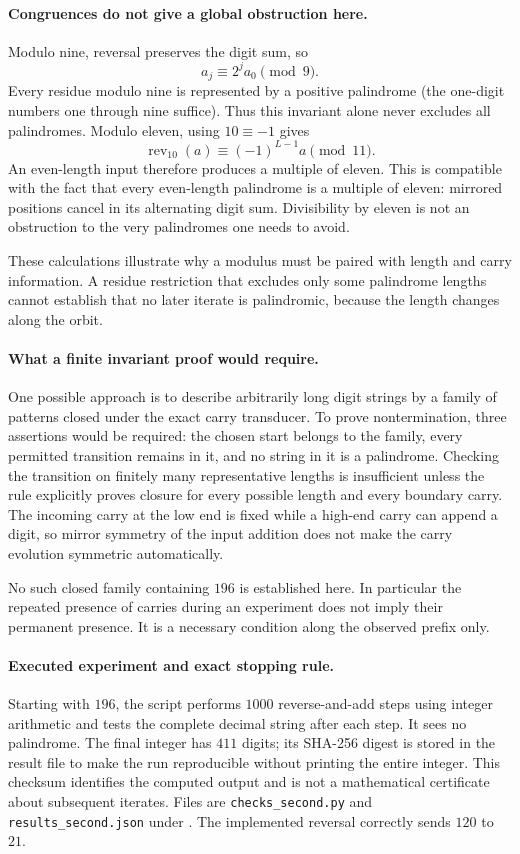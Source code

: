 \documentclass[11pt,a4paper]{article}
\begin{document}
\paragraph{Congruences do not give a global obstruction here.}
Modulo nine, reversal preserves the digit sum, so
\[
                        a_j\equiv2^j a_0\pmod9.
\]
Every residue modulo nine is represented by a positive palindrome
(the one-digit numbers one through nine suffice). Thus this invariant
alone never excludes all palindromes. Modulo eleven, using
$10\equiv-1$ gives
\[
 \operatorname{rev}_{10}(a)\equiv(-1)^{L-1}a\pmod{11}.
\]
An even-length input therefore produces a multiple of eleven. This is
compatible with the fact that every even-length palindrome is a
multiple of eleven: mirrored positions cancel in its alternating
digit sum. Divisibility by eleven is not an obstruction to the very
palindromes one needs to avoid.

These calculations illustrate why a modulus must be paired with
length and carry information. A residue restriction that excludes only
some palindrome lengths cannot establish that no later iterate is
palindromic, because the length changes along the orbit.

\paragraph{What a finite invariant proof would require.}
One possible approach is to describe arbitrarily long digit strings
by a family of patterns closed under the exact carry transducer.
To prove nontermination, three assertions would be required: the chosen
start belongs to the family, every permitted transition remains in it,
and no string in it is a palindrome. Checking the transition on finitely
many representative lengths is insufficient unless the rule explicitly
proves closure for every possible length and every boundary carry.
The incoming carry at the low end is fixed while a high-end carry can
append a digit, so mirror symmetry of the input addition does not make
the carry evolution symmetric automatically.

No such closed family containing $196$ is established here. In
particular the repeated presence of carries during an experiment does
not imply their permanent presence. It is a necessary condition along
the observed prefix only.

\paragraph{Executed experiment and exact stopping rule.}
Starting with $196$, the script performs $1000$ reverse-and-add steps
using integer arithmetic and tests the complete decimal string after
each step. It sees no palindrome. The final integer has $411$ digits;
its SHA-256 digest is stored in the result file to make the run
reproducible without printing the entire integer. This checksum
identifies the computed output and is not a mathematical certificate
about subsequent iterates. Files are \texttt{checks\_second.py} and
\texttt{results\_second.json} under
.
The implemented reversal correctly sends $120$ to $21$.
\end{document}
